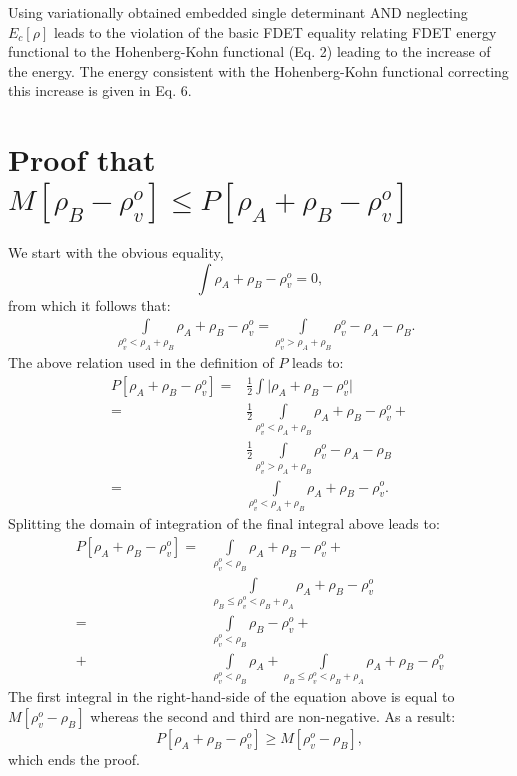 \documentclass[amsmath,amssymb,preprint,aip,jcp]{revtex4-1}
\begin{document}
Using variationally obtained embedded single determinant AND neglecting $E_c[\rho]$ leads to the violation of the basic FDET equality relating FDET energy functional to the Hohenberg-Kohn functional (Eq. 2) leading to the increase of the energy. The energy consistent with the Hohenberg-Kohn functional correcting this increase is given in Eq. 6.

\section{Proof that $M[\rho_{B} - \rho_{v}^{o}] \leq P[\rho_A+\rho_B - \rho_{v}^{o}] $}
We start with the obvious equality,
\begin{equation}
\int \rho_A + \rho_B - \rho_{v}^o = 0, 
\end{equation}
from which it follows that:
\begin{align}
 & \int\limits_{\rho_{v}^o < \rho_A + \rho_B}\rho_A + \rho_B - \rho_{v}^o = \int\limits_{\rho_{v}^o > \rho_A + \rho_B}\rho_{v}^o - \rho_A - \rho_B.
\end{align}
The above relation used in the definition of $P$ leads to:
\begin{align}\label{eq:P_alternatives}
P[\rho_A + \rho_B - \rho_{v}^o] = & \frac{1}{2}  \int \vert \rho_A + \rho_B - \rho_{v}^o \vert \\ \nonumber
 = & \frac{1}{2}  \int\limits_{\rho_{v}^o <\rho_A + \rho_B}\rho_A + \rho_B - \rho_{v}^o + \\ \nonumber
 & \frac{1}{2}  \int\limits_{\rho_{v}^o > \rho_A + \rho_B} \rho_{v}^o - \rho_A - \rho_B \\ \nonumber
= & \int\limits_{\rho_{v}^o <\rho_A + \rho_B}\rho_A + \rho_B - \rho_{v}^o.
\end{align}
Splitting the domain of integration of the final integral above  leads to: 
\begin{align}
P[\rho_A + \rho_B - \rho_{v}^o] = & \int\limits_{\rho_{v}^o < \rho_B}\rho_A + \rho_B - \rho_{v}^o + \\ \nonumber
 & \int\limits_{\rho_B \leq \rho_{v}^o < \rho_B + \rho_A}\rho_A + \rho_B - \rho_{v}^o\nonumber \\
 = & \int\limits_{\rho_{v}^o < \rho_B} \rho_B - \rho_{v}^o + \\ \nonumber
 +&\int\limits_{\rho_{v}^o < \rho_B}\rho_A + \int\limits_{\rho_B \leq \rho_{v}^o < \rho_B + \rho_A}\rho_A + \rho_B - \rho_{v}^o\nonumber 
\end{align}
The first integral in the right-hand-side of the equation above is equal to $M[\rho_{v}^o - \rho_B]$ whereas the second and third are non-negative. As a result:
\begin{equation}
 P[\rho_A + \rho_B - \rho_{v}^o] \geq M[\rho_{v}^o - \rho_B],
\end{equation}
which ends the proof.
\end{document}
